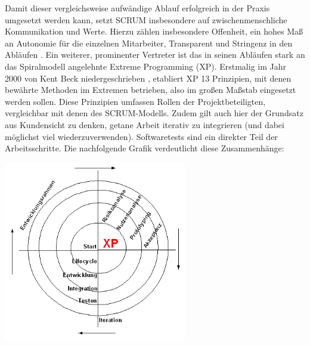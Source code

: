 Damit dieser vergleichsweise aufwändige Ablauf erfolgreich in der Praxis umgesetzt werden kann, setzt \gls{SCRUM} insbesondere auf zwischenmenschliche Kommunikation und Werte. Hierzu zählen insbesondere Offenheit, ein hohes Maß an Autonomie für die einzelnen Mitarbeiter, Transparent und Stringenz in den Abläufen \cite{SCRUM_values_nodate}.\newline
Ein weiterer, prominenter Vertreter ist das in seinen Abläufen stark an das Spiralmodell angelehnte Extreme Programming (\acrshort{XP}). Erstmalig im Jahr 2000 von Kent Beck niedergeschrieben \cite{beck_extreme_2000}, etabliert \acrshort{XP} 13 Prinzipien, mit denen bewährte Methoden \glqq im Extremen\grqq{} betrieben, also im großen Maßstab eingesetzt werden sollen.
Diese Prinzipien umfassen Rollen der Projektbeteiligten, vergleichbar mit denen des \gls{SCRUM}-Modells. Zudem gilt auch hier der Grundsatz aus Kundensicht zu denken, getane Arbeit iterativ zu integrieren (und dabei möglichst viel wiederzuverwenden). Softwaretests sind ein direkter Teil der Arbeitsschritte. Die nachfolgende Grafik verdeutlicht diese Zusammenhänge:

\begin{center}
    \includegraphics[width=0.6\textwidth]{Grafiken/XP-Life.png}
    \label{Grafik:Zyklen des Extreme Programmings}
\end{center}

